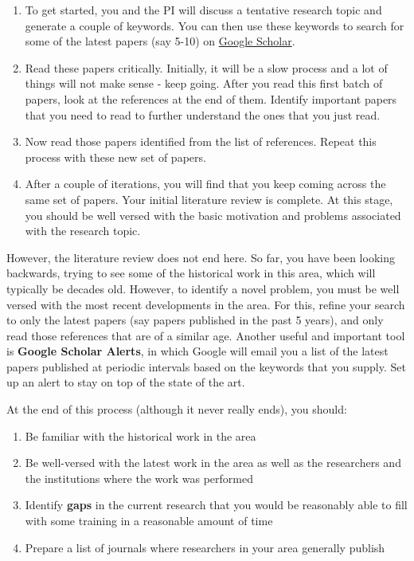 \documentclass[12pt]{article}
\begin{document}
\begin{enumerate}
	\item To get started, you and the PI will discuss a tentative research topic and generate a couple of keywords. You can then use these keywords to search for some of the latest papers (say 5-10) on \href{https://scholar.google.com/}{Google Scholar}.
	\item Read these papers critically. Initially, it will be a slow process and a lot of things will not make sense - keep going. After you read this first batch of papers, look at the references at the end of them. Identify important papers that you need to read to further understand the ones that you just read.
	\item Now read those papers identified from the list of references. Repeat this process with these new set of papers.
	\item After a couple of iterations, you will find that you keep coming across the same set of papers. Your initial literature review is complete. At this stage, you should be well versed with the basic motivation and problems associated with the research topic.
\end{enumerate}

However, the literature review does not end here. So far, you have been looking backwards, trying to see some of the historical work in this area, which will typically be decades old. However, to identify a novel problem, you must be well versed with the most recent developments in the area. For this, refine your search to only the latest papers (say papers published in the past 5 years), and only read those references that are of a similar age. Another useful and important tool is \textbf{Google Scholar Alerts}, in which Google will email you a list of the latest papers published at periodic intervals based on the keywords that you supply. Set up an alert to stay on top of the state of the art.

At the end of this process (although it never really ends), you should:

\begin{enumerate}
	\item Be familiar with the historical work in the area
	\item Be well-versed with the latest work in the area as well as the researchers and the institutions where the work was performed
	\item Identify \textbf{gaps} in the current research that you would be reasonably able to fill with some training in a reasonable amount of time
	\item Prepare a list of journals where researchers in your area generally publish
\end{enumerate}
\end{document}
